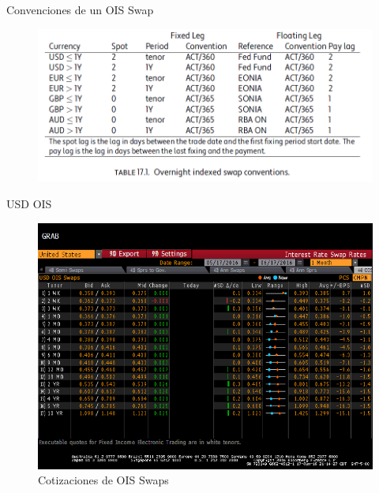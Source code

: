 \documentclass[11pt]{beamer}
\begin{document}
\begin{frame}{Convenciones de un OIS Swap}
	\begin{figure}
		\centering
		\includegraphics[width=1\linewidth]{OISQUOTES}
		\label{fig:oisquotes}
	\end{figure}
	
\end{frame}

\begin{frame}{USD OIS}
	\begin{figure}
		\centering
		\includegraphics[width=.8\linewidth]{USDOIS}
		\caption{Cotizaciones de OIS Swaps}
		\label{fig:usdois}
	\end{figure}
	
\end{frame}
\end{document}
